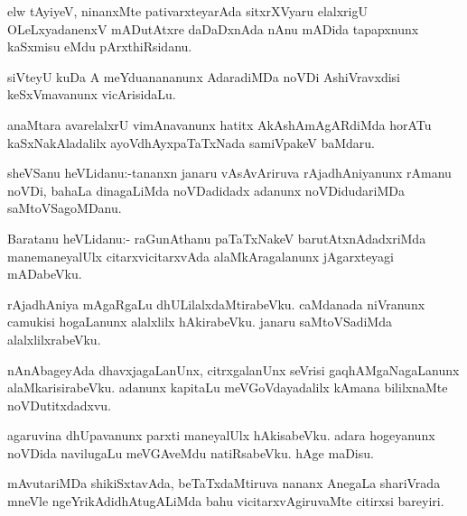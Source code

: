 \documentclass{article}
\begin{document}
\begin{mn}%
elw tAyiyeV, ninanxMte pativarxteyarAda sitxrXVyaru elalxrigU OLeLxyadanenxV mADutAtxre 
daDaDxnAda nAnu mADida tapapxnunx kaSxmisu eMdu pArxthiRsidanu.
\end{mn}

\begin{mn}%
siVteyU kuDa A meYduanananunx AdaradiMDa noVDi AshiVravxdisi keSxVmavanunx vicArisidaLu.
\end{mn}

\begin{mn}%
anaMtara avarelalxrU vimAnavanunx hatitx AkAshAmAgARdiMda horATu kaSxNakAladalilx 
ayoVdhAyxpaTaTxNada samiVpakeV baMdaru.
\end{mn}


\begin{mn}%
sheVSanu heVLidanu:-tananxn janaru vAsAvAriruva rAjadhAniyanunx rAmanu noVDi, bahaLa 
dinagaLiMda noVDadidadx adanunx noVDidudariMDa saMtoVSagoMDanu. 
\end{mn}

\begin{mn}%
Baratanu heVLidanu:- raGunAthanu paTaTxNakeV barutAtxnAdadxriMda manemaneyalUlx 
citarxvicitarxvAda alaMkAragalanunx jAgarxteyagi mADabeVku. 
\end{mn}

\begin{mn}%
rAjadhAniya mAgaRgaLu dhULilalxdaMtirabeVku. caMdanada niVranunx camukisi hogaLanunx 
alalxlilx hAkirabeVku. janaru saMtoVSadiMda alalxlilxrabeVku.
\end{mn}

\begin{mn}%
nAnAbageyAda dhavxjagaLanUnx, citrxgalanUnx seVrisi gaqhAMgaNagaLanunx alaMkarisirabeVku. 
adanunx kapitaLu meVGoVdayadalilx kAmana bililxnaMte noVDutitxdadxvu.
\end{mn}

\begin{mn}%
agaruvina dhUpavanunx parxti maneyalUlx hAkisabeVku. adara hogeyanunx noVDida navilugaLu 
meVGAveMdu natiRsabeVku. hAge maDisu.
\end{mn}

\begin{mn}%
mAvutariMDa shikiSxtavAda, beTaTxdaMtiruva nananx AnegaLa shariVrada mneVle 
ngeYrikAdidhAtugALiMda bahu vicitarxvAgiruvaMte citirxsi bareyiri.
\end{mn}
\end{document}
